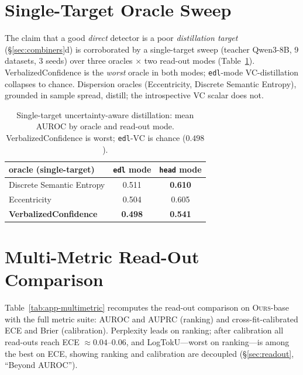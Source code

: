 \documentclass[11pt]{article}
\newcommand{\ours}{\textsc{Ours}}
\newcommand{\best}[1]{\textbf{#1}}
\begin{document}
\section{Single-Target Oracle Sweep}\label{app:rq5}
The claim that a good \emph{direct} detector is a poor \emph{distillation target}
(\S\ref{sec:combiners}d) is corroborated by a single-target sweep (teacher Qwen3-8B, 9
datasets, 3 seeds) over three oracles $\times$ two read-out modes
(Table~\ref{tab:app-rq5}). VerbalizedConfidence is the \emph{worst} oracle in both modes;
\texttt{edl}-mode VC-distillation collapses to chance. Dispersion oracles (Eccentricity,
Discrete Semantic Entropy), grounded in sample spread, distill; the introspective VC
scalar does not.

\begin{table}[t]\centering\small
\begin{tabular}{l cc}
\toprule
oracle (single-target) & \texttt{edl} mode & \texttt{head} mode\\
\midrule
Discrete Semantic Entropy   & 0.511 & \best{0.610}\\
Eccentricity                & 0.504 & 0.605\\
\textbf{VerbalizedConfidence} & \textbf{0.498} & \textbf{0.541}\\
\bottomrule
\end{tabular}
\caption{Single-target uncertainty-aware distillation: mean AUROC by oracle and read-out
mode. VerbalizedConfidence is worst; \texttt{edl}-VC is chance ($0.498$).}
\label{tab:app-rq5}
\end{table}

\section{Multi-Metric Read-Out Comparison}\label{app:multimetric}
Table~\ref{tab:app-multimetric} recomputes the read-out comparison on \ours-base with the
full metric suite: AUROC and AUPRC (ranking) and cross-fit-calibrated ECE and Brier
(calibration). Perplexity leads on ranking; after calibration all read-outs reach ECE
$\approx0.04$--$0.06$, and LogTokU---worst on ranking---is among the best on ECE, showing
ranking and calibration are decoupled (\S\ref{sec:readout}, ``Beyond AUROC'').
\end{document}
